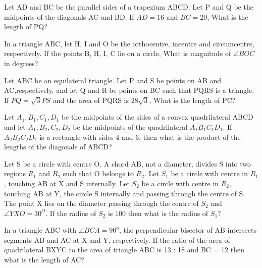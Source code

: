 \item Let AD and BC be the parallel sides of a trapezium ABCD. Let P and Q be the midpoints of the diagonals AC and BD. If $AD = 16$ and $BC = 20$, What is the length of PQ?

\item In a triangle ABC, let H, I and O be the orthocentre, incentre and circumcentre, respectively. If the points B, H, I, C lie on a circle, What is magnitude of $\angle BOC$ in degrees?

\item Let ABC be an equilateral triangle. Let P and S be points on AB and AC,respectively, and let Q and R be points on BC such that PQRS is a triangle. If $PQ = \sqrt{3}PS$ and the area of PQRS is $28\sqrt{3}$, What is the length of PC?

\item Let $A_1, B_1, C_1, D_1$ be the midpoints of the sides of a convex quadrilateral ABCD and let $A_1, B_2, C_2, D_2$ be the midpoints of the quadrilateral $A_1B_1C_1D_1$. If $A_2B_2C_2D_2$ is a rectangle with sides 4 and 6, then what is the product of the lengths of the diagonals of ABCD?

\item Let S be a circle with centre O. A chord AB, not a diameter, divides S into two regions $R_1$ and $R_2$ such that O belongs to $R_2$. Let $S_1$ be a circle with centre in $R_1$, touching AB at X and S internally. Let $S_2$ be a circle with centre in $R_2$, touching AB at Y, the circle S internally and passing through the centre of S. The point X lies on the diameter passing through the centre of  $S_2$ and $\angle YXO = 30^O$. If the radius of $S_2$ is 100 then what is the radius of $S_1$?

\item In a triangle ABC with $\angle BCA = 90^{o}$, the perpendicular bisector of AB intersects segments AB and AC at X and Y, respectively. If the ratio of the area of quadrilateral BXYC to the area of triangle ABC is 13 : 18 and BC = 12 then what is the length of AC?
